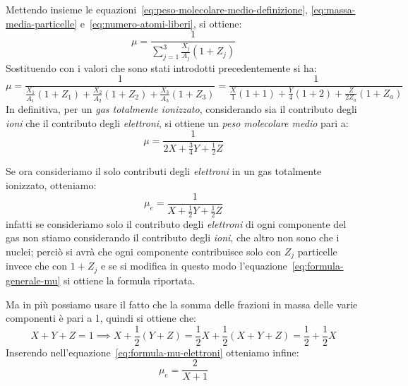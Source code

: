 Mettendo insieme le equazioni~\eqref{eq:peso-molecolare-medio-definizione}, \eqref{eq:massa-media-particelle} e~\eqref{eq:numero-atomi-liberi}, si ottiene:
\begin{equation}
    \mu = \dfrac{1}{\sum_{j=1}^3 \frac{X_j}{A_j} (1+Z_j)}
    \label{eq:formula-generale-mu}
\end{equation}
Sostituendo con i valori che sono stati introdotti precedentemente si ha:
\[
\mu = \dfrac{1}{\frac{X_1}{A_1}(1+Z_1) + \frac{X_2}{A_2}(1+Z_2) + \frac{X_3}{A_3}(1+Z_3)} = \dfrac{1}{\frac{X}{1}(1+1) + \frac{Y}{4}(1+2) + \frac{Z}{2 Z_a}(1+Z_a)}
\]
In definitiva, per un \emph{gas totalmente ionizzato}, considerando sia il contributo degli \emph{ioni} che il contributo degli \emph{elettroni}, si ottiene un \emph{peso molecolare medio} pari a:
\begin{equation}\label{eq:peso-molecolare-gas-ionizzato}
    \mu = \dfrac{1}{2 X + \frac{3}{4} Y + \frac{1}{2} Z}
\end{equation}

Se ora consideriamo il solo contributi degli \emph{elettroni} in un gas totalmente ionizzato, otteniamo:
\begin{equation}
    \mu_e = \dfrac{1}{X + \frac{1}{2} Y + \frac{1}{2}Z}
    \label{eq:formula-mu-elettroni}
\end{equation}
infatti se consideriamo solo il contributo degli \emph{elettroni} di ogni componente del gas non stiamo considerando il contributo degli \emph{ioni}, che altro non sono che i nuclei; perciò si avrà che ogni componente contribuisce solo con $Z_j$ particelle invece che con $1+Z_j$ e se si modifica in questo modo l'equazione~\eqref{eq:formula-generale-mu} si ottiene la formula riportata.

Ma in più possiamo usare il fatto che la somma delle frazioni in massa delle varie componenti è pari a 1, quindi si ottiene che:  
\[
X+Y+Z=1 \implies X + \frac{1}{2}(Y+Z) = \frac{1}{2}X + \frac{1}{2}(X+Y+Z) =\frac{1}{2} + \frac{1}{2}X
\]
Inserendo nell'equazione~\eqref{eq:formula-mu-elettroni} otteniamo infine:
\begin{equation}\label{eq:peso-molecolare-elettroni}
    \mu_e = \dfrac{2}{X+1}
\end{equation}

